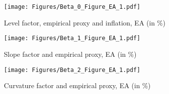 \begin{figure}[!t]
    \centering
    \texttt{[image: Figures/Beta\_0\_Figure\_EA\_1.pdf]}
    \caption{Level factor, empirical proxy and inflation, EA (in \%)}
    \label{fig:level_factor_ea}
\end{figure}

\begin{figure}[!t]
    \centering
    \texttt{[image: Figures/Beta\_1\_Figure\_EA\_1.pdf]}
    \caption{Slope factor and empirical proxy, EA (in \%)}
    \label{fig:slope_factor_ea}
\end{figure}

\begin{figure}[!t]
    \centering
    \texttt{[image: Figures/Beta\_2\_Figure\_EA\_1.pdf]}
    \caption{Curvature factor and empirical proxy, EA (in \%)}
    \label{fig:curvature_factor_ea}
\end{figure}

